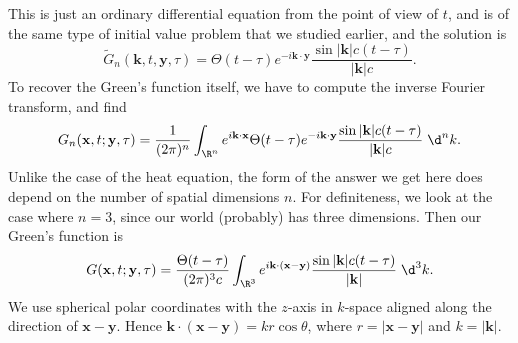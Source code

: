 \documentclass[a4paper]{article}
\begin{document}
This is just an ordinary differential equation from the point of view of $t$, and is of the same type of initial value problem that we studied earlier, and the solution is
\[
  \tilde{G}_n (\mathbf{k}, t, \mathbf{y}, \tau) = \Theta(t - \tau) e^{-i\mathbf{k} \cdot \mathbf{y}} \frac{\sin |\mathbf{k}| c (t - \tau)}{|\mathbf{k}| c}.
\]
To recover the Green's function itself, we have to compute the inverse Fourier transform, and find
\[
  G_n(\mathbf{x}, t; \mathbf{y}, \tau) = \frac{1}{(2\pi)^n} \int_{\R^n} e^{i\mathbf{k}\cdot \mathbf{x}} \Theta(t - \tau) e^{-i\mathbf{k}\cdot \mathbf{y}}\frac{\sin |\mathbf{k}| c(t - \tau)}{|\mathbf{k}| c} \;\d^n k.
\]
Unlike the case of the heat equation, the form of the answer we get here does depend on the number of spatial dimensions $n$. For definiteness, we look at the case where $n = 3$, since our world (probably) has three dimensions. Then our Green's function is
\[
  G(\mathbf{x}, t; \mathbf{y}, \tau) = \frac{\Theta(t - \tau)}{(2\pi)^3 c} \int_{\R^3} e^{i\mathbf{k}\cdot (\mathbf{x} - \mathbf{y})} \frac{\sin |\mathbf{k}|c(t - \tau)}{|\mathbf{k}|} \;\d^3 k.
\]
We use spherical polar coordinates with the $z$-axis in $k$-space aligned along the direction of $\mathbf{x} - \mathbf{y}$. Hence $\mathbf{k}\cdot (\mathbf{x} - \mathbf{y}) = kr \cos \theta$, where $r = |\mathbf{x} - \mathbf{y}|$ and $k = |\mathbf{k}|$.
\end{document}
